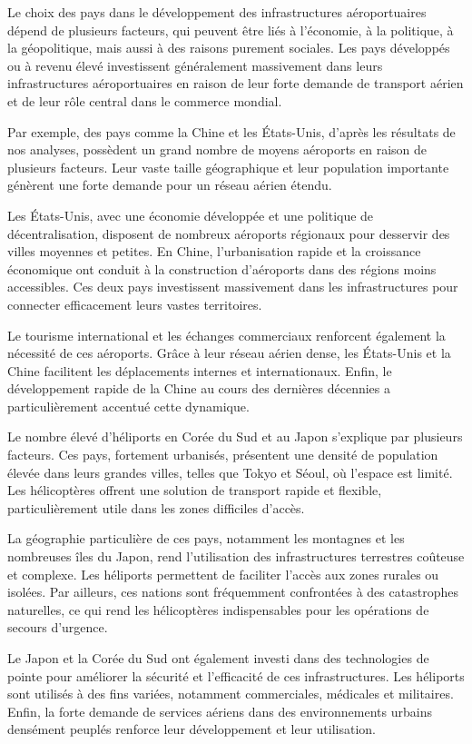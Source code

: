 \documentclass[
]{compterendu}
\begin{document}
Le choix des pays dans le développement des infrastructures
aéroportuaires dépend de plusieurs facteurs, qui peuvent être liés à
l'économie, à la politique, à la géopolitique, mais aussi à des raisons
purement sociales. Les pays développés ou à revenu élevé investissent
généralement massivement dans leurs infrastructures aéroportuaires en
raison de leur forte demande de transport aérien et de leur rôle central
dans le commerce mondial.

Par exemple, des pays comme la Chine et les États-Unis, d'après les
résultats de nos analyses, possèdent un grand nombre de moyens aéroports
en raison de plusieurs facteurs. Leur vaste taille géographique et leur
population importante génèrent une forte demande pour un réseau aérien
étendu.

Les États-Unis, avec une économie développée et une politique de
décentralisation, disposent de nombreux aéroports régionaux pour
desservir des villes moyennes et petites. En Chine, l'urbanisation
rapide et la croissance économique ont conduit à la construction
d'aéroports dans des régions moins accessibles. Ces deux pays
investissent massivement dans les infrastructures pour connecter
efficacement leurs vastes territoires.

Le tourisme international et les échanges commerciaux renforcent
également la nécessité de ces aéroports. Grâce à leur réseau aérien
dense, les États-Unis et la Chine facilitent les déplacements internes
et internationaux. Enfin, le développement rapide de la Chine au cours
des dernières décennies a particulièrement accentué cette dynamique.

Le nombre élevé d'héliports en Corée du Sud et au Japon s'explique par
plusieurs facteurs. Ces pays, fortement urbanisés, présentent une
densité de population élevée dans leurs grandes villes, telles que Tokyo
et Séoul, où l'espace est limité. Les hélicoptères offrent une solution
de transport rapide et flexible, particulièrement utile dans les zones
difficiles d'accès.

La géographie particulière de ces pays, notamment les montagnes et les
nombreuses îles du Japon, rend l'utilisation des infrastructures
terrestres coûteuse et complexe. Les héliports permettent de faciliter
l'accès aux zones rurales ou isolées. Par ailleurs, ces nations sont
fréquemment confrontées à des catastrophes naturelles, ce qui rend les
hélicoptères indispensables pour les opérations de secours d'urgence.

Le Japon et la Corée du Sud ont également investi dans des technologies
de pointe pour améliorer la sécurité et l'efficacité de ces
infrastructures. Les héliports sont utilisés à des fins variées,
notamment commerciales, médicales et militaires. Enfin, la forte demande
de services aériens dans des environnements urbains densément peuplés
renforce leur développement et leur utilisation.
\end{document}
